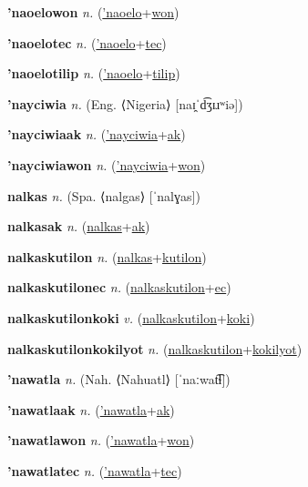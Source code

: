 \textbf{\hypertarget{'naoelowon}{'naoelowon}} \textit{n.} (\hyperlink{'naoelo}{'naoelo}+\allowbreak \hyperlink{won}{won})


\textbf{\hypertarget{'naoelotec}{'naoelotec}} \textit{n.} (\hyperlink{'naoelo}{'naoelo}+\allowbreak \hyperlink{tec}{tec})


\textbf{\hypertarget{'naoelotilip}{'naoelotilip}} \textit{n.} (\hyperlink{'naoelo}{'naoelo}+\allowbreak \hyperlink{tilip}{tilip})


\textbf{\hypertarget{'nayciwia}{'nayciwia}} \textit{n.} (Eng. ⟨Nigeria⟩ [naɪ̯ˈd͡ʒɪɹʷiə])


\textbf{\hypertarget{'nayciwiaak}{'nayciwiaak}} \textit{n.} (\hyperlink{'nayciwia}{'nayciwia}+\allowbreak \hyperlink{ak}{ak})


\textbf{\hypertarget{'nayciwiawon}{'nayciwiawon}} \textit{n.} (\hyperlink{'nayciwia}{'nayciwia}+\allowbreak \hyperlink{won}{won})


\textbf{\hypertarget{nalkas}{nalkas}} \textit{n.} (Spa. ⟨nalgas⟩ [ˈnalɣas])


\textbf{\hypertarget{nalkasak}{nalkasak}} \textit{n.} (\hyperlink{nalkas}{nalkas}+\allowbreak \hyperlink{ak}{ak})


\textbf{\hypertarget{nalkaskutilon}{nalkaskutilon}} \textit{n.} (\hyperlink{nalkas}{nalkas}+\allowbreak \hyperlink{kutilon}{kutilon})


\textbf{\hypertarget{nalkaskutilonec}{nalkaskutilonec}} \textit{n.} (\hyperlink{nalkaskutilon}{nalkaskutilon}+\allowbreak \hyperlink{ec}{ec})


\textbf{\hypertarget{nalkaskutilonkoki}{nalkaskutilonkoki}} \textit{v.} (\hyperlink{nalkaskutilon}{nalkaskutilon}+\allowbreak \hyperlink{koki}{koki})


\textbf{\hypertarget{nalkaskutilonkokilyot}{nalkaskutilonkokilyot}} \textit{n.} (\hyperlink{nalkaskutilon}{nalkaskutilon}+\allowbreak \hyperlink{kokilyot}{kokilyot})


\textbf{\hypertarget{'nawatla}{'nawatla}} \textit{n.} (Nah. ⟨Nahuatl⟩ [ˈnaːwat͡ɬ])


\textbf{\hypertarget{'nawatlaak}{'nawatlaak}} \textit{n.} (\hyperlink{'nawatla}{'nawatla}+\allowbreak \hyperlink{ak}{ak})


\textbf{\hypertarget{'nawatlawon}{'nawatlawon}} \textit{n.} (\hyperlink{'nawatla}{'nawatla}+\allowbreak \hyperlink{won}{won})


\textbf{\hypertarget{'nawatlatec}{'nawatlatec}} \textit{n.} (\hyperlink{'nawatla}{'nawatla}+\allowbreak \hyperlink{tec}{tec})


